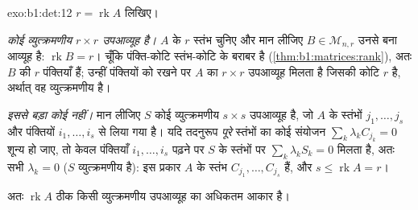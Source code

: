 \begin{solution}{exo:b1:det:12}
$r = \operatorname{rk} A$ लिखिए।

\emph{कोई व्युत्क्रमणीय $r \times r$ उपआव्यूह है।} $A$ के $r$  स्तंभ
चुनिए और मान लीजिए $B \in \mathcal{M}_{n,r}$ उनसे बना आव्यूह है:
$\operatorname{rk} B = r$। चूँकि पंक्ति-कोटि स्तंभ-कोटि के बराबर है
(\cref{thm:b1:matrices:rank}), अतः $B$ की $r$ पंक्तियाँ  हैं; उन्हीं
पंक्तियों को रखने पर $A$ का $r \times r$ उपआव्यूह मिलता है जिसकी कोटि $r$
है, अर्थात् वह व्युत्क्रमणीय है।

\emph{इससे बड़ा कोई नहीं।} मान लीजिए $S$ कोई व्युत्क्रमणीय $s \times s$
उपआव्यूह है, जो $A$ के स्तंभों $j_1, \dots, j_s$ और पंक्तियों $i_1, \dots,
i_s$ से लिया गया है। यदि तदनुरूप \emph{पूरे} स्तंभों का कोई संयोजन $\sum_k
\lambda_k C_{j_k} = 0$ शून्य हो जाए, तो केवल पंक्तियाँ $i_1, \dots, i_s$
पढ़ने पर $S$ के स्तंभों पर $\sum_k \lambda_k S_k = 0$ मिलता है, अतः सभी
$\lambda_k = 0$ ($S$ व्युत्क्रमणीय है): इस प्रकार $A$ के स्तंभ $C_{j_1},
\dots, C_{j_s}$  हैं, और $s \leq \operatorname{rk} A = r$।

अतः $\operatorname{rk} A$ ठीक किसी व्युत्क्रमणीय उपआव्यूह का अधिकतम आकार है।
\end{solution}

